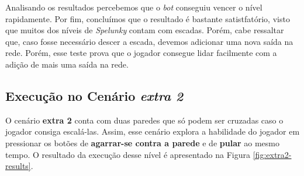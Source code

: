Analisando os resultados percebemos que o \textit{bot} conseguiu vencer o nível
rapidamente. Por fim, concluímos que o resultado é bastante satistfatório,
visto que muitos dos níveis de \textit{Spelunky} contam com escadas. Porém,
cabe ressaltar que, caso fosse necessário descer a escada, devemos adicionar
uma nova saída na rede. Porém, esse teste prova que o jogador consegue lidar
facilmente com a adição de mais uma saída na rede.

\subsection{\label{section:experiment-extra2}Execução no Cenário \textit{extra
2}}

O cenário \textbf{extra 2} conta com duas paredes que só podem ser cruzadas
caso o jogador consiga escalá-las. Assim, esse cenário explora a habilidade do
jogador em pressionar os botões de \textbf{agarrar-se contra a parede} e de
\textbf{pular} ao mesmo tempo. O resultado da execução desse nível é
apresentado na Figura \ref{fig:extra2-results}.

